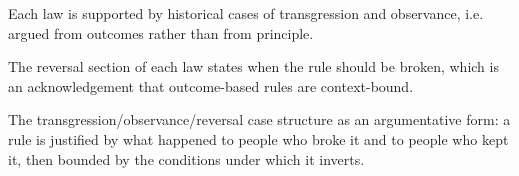 

\begin{distilled}
  \item Each law is supported by historical cases of transgression and observance, i.e. argued from outcomes rather than from principle.
  \item The reversal section of each law states when the rule should be broken, which is an acknowledgement that outcome-based rules are context-bound.
\end{distilled}

\begin{unique}
  \item The transgression/observance/reversal case structure as an argumentative form: a rule is justified by what happened to people who broke it and to people who kept it, then bounded by the conditions under which it inverts.
\end{unique}
